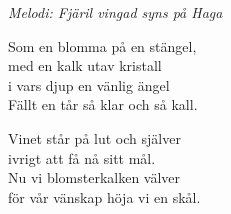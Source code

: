 {\footnotesize\textit{Melodi: Fjäril vingad syns på Haga}}\par
\vspace{10pt}
Som en blomma på en stängel,\\
med en kalk utav kristall\\
i vars djup en vänlig ängel\\
Fällt en tår så klar och så kall.\par
\vspace{10pt}
Vinet står på lut och själver\\
ivrigt att få nå sitt mål.\\
Nu vi blomsterkalken välver\\
för vår vänskap höja vi en skål.

